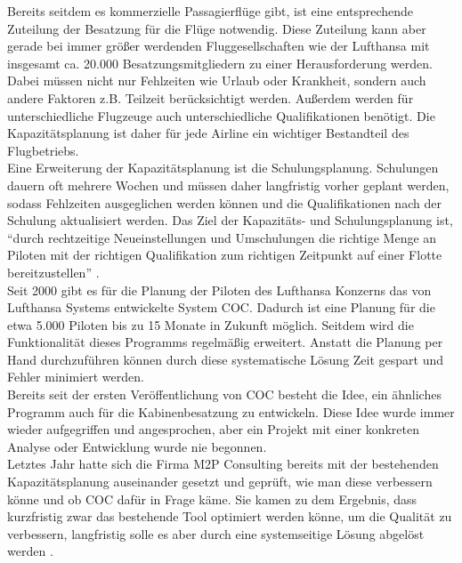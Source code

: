 \documentclass [12pt, a4paper, oneside, titlepage, ngerman]{article}
\begin{document}
Bereits seitdem es kommerzielle Passagierflüge gibt, ist eine entsprechende Zuteilung der Besatzung für die Flüge notwendig. Diese Zuteilung kann aber gerade bei immer größer werdenden Fluggesellschaften wie der Lufthansa mit insgesamt ca. 20.000 Besatzungsmitgliedern zu einer Herausforderung werden. Dabei müssen nicht nur Fehlzeiten wie Urlaub oder Krankheit, sondern auch andere Faktoren z.B. Teilzeit berücksichtigt werden. Außerdem werden für unterschiedliche Flugzeuge auch unterschiedliche Qualifikationen benötigt. Die Kapazitätsplanung ist daher für jede Airline ein wichtiger Bestandteil des Flugbetriebs. \\
Eine Erweiterung der Kapazitätsplanung ist die Schulungsplanung. Schulungen dauern oft mehrere Wochen und müssen daher langfristig vorher geplant werden, sodass Fehlzeiten ausgeglichen werden können und die Qualifikationen nach der Schulung aktualisiert werden. Das Ziel der Kapazitäts- und Schulungsplanung ist, "`durch rechtzeitige Neueinstellungen und Umschulungen die richtige Menge an Piloten mit der richtigen Qualifikation zum richtigen Zeitpunkt auf einer Flotte bereitzustellen"' \cite[vgl.][S.19]{compasdoku}. \\

\noindent Seit 2000 gibt es für die Planung der Piloten des Lufthansa Konzerns das von Lufthansa Systems entwickelte System \ac{COC}. Dadurch ist eine Planung für die etwa 5.000 Piloten bis zu 15 Monate in Zukunft möglich. Seitdem wird die Funktionalität dieses Programms regelmäßig erweitert. Anstatt die Planung per Hand durchzuführen können durch diese systematische Lösung Zeit gespart und Fehler minimiert werden. \\
Bereits seit der ersten Veröffentlichung von \ac{COC} besteht die Idee, ein ähnliches Programm auch für die Kabinenbesatzung zu entwickeln. Diese Idee wurde immer wieder aufgegriffen und angesprochen, aber ein Projekt mit einer konkreten Analyse oder Entwicklung wurde nie begonnen. \\

\noindent Letztes Jahr hatte sich die Firma M2P Consulting bereits mit der bestehenden Kapazitätsplanung auseinander gesetzt und geprüft, wie man diese verbessern könne und ob \ac{COC} dafür in Frage käme. Sie kamen zu dem Ergebnis, dass kurzfristig zwar das bestehende Tool optimiert werden könne, um die Qualität zu verbessern, langfristig solle es aber durch eine systemseitige Lösung abgelöst werden \cite [vgl.][S.8-10]{M2P}. %
\end{document}
